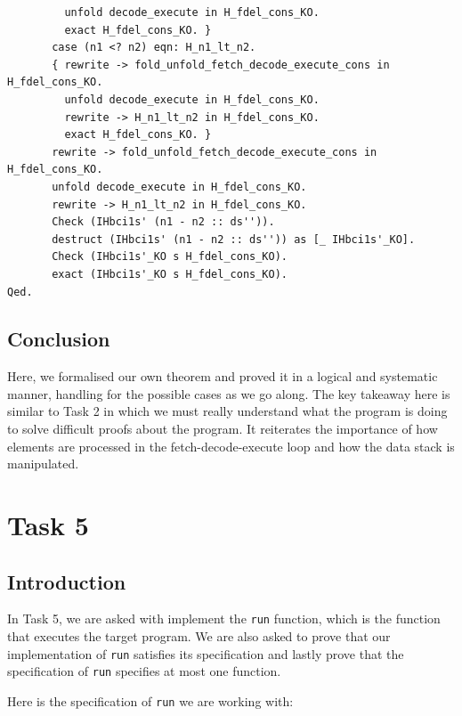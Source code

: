 \documentclass{article}
\begin{document}
\begin{lstlisting}
         unfold decode_execute in H_fdel_cons_KO.
         exact H_fdel_cons_KO. }
       case (n1 <? n2) eqn: H_n1_lt_n2.
       { rewrite -> fold_unfold_fetch_decode_execute_cons in H_fdel_cons_KO.
         unfold decode_execute in H_fdel_cons_KO.
         rewrite -> H_n1_lt_n2 in H_fdel_cons_KO.
         exact H_fdel_cons_KO. }
       rewrite -> fold_unfold_fetch_decode_execute_cons in H_fdel_cons_KO.
       unfold decode_execute in H_fdel_cons_KO.
       rewrite -> H_n1_lt_n2 in H_fdel_cons_KO.
       Check (IHbci1s' (n1 - n2 :: ds'')).
       destruct (IHbci1s' (n1 - n2 :: ds'')) as [_ IHbci1s'_KO].
       Check (IHbci1s'_KO s H_fdel_cons_KO).
       exact (IHbci1s'_KO s H_fdel_cons_KO).
Qed.
\end{lstlisting}

\subsection{Conclusion}

Here, we formalised our own theorem and proved it in a logical and systematic manner, handling for the possible cases as we go along. The key takeaway here is similar to Task 2 in which we must really understand what the program is doing to solve difficult proofs about the program. It reiterates the importance of how elements are processed in the fetch-decode-execute loop and how the data stack is manipulated.

\section{Task 5}

\subsection{Introduction}
In Task 5, we are asked with implement the \texttt{run} function, which is the function that executes the target program. We are also asked to prove that our implementation of \texttt{run} satisfies its specification and lastly prove that the specification of \texttt{run} specifies at most one function.

Here is the specification of \texttt{run} we are working with:
\end{document}

